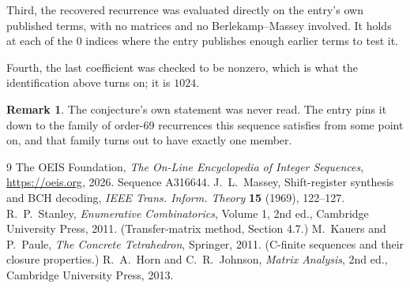 \documentclass[11pt,a4paper]{article}
\theoremstyle{plain}
\theoremstyle{definition}
\newtheorem{remark}[theorem]{Remark}
\begin{document}
Third, the recovered recurrence was evaluated directly on the entry's own published terms, with
no matrices and no Berlekamp--Massey involved. It holds at each of the $0$ indices where
the entry publishes enough earlier terms to test it.

Fourth, the last coefficient was checked to be nonzero, which is what the identification above
turns on; it is $1024$.

\begin{remark}
The conjecture's own statement was never read. The entry pins it down to the family of
order-$69$ recurrences this sequence satisfies from some point on, and that family turns
out to have exactly one member.
\end{remark}

\begin{thebibliography}{9}
 The OEIS Foundation, \emph{The On-Line Encyclopedia of Integer
Sequences}, \url{https://oeis.org}, 2026. Sequence A316644.
 J.~L.~Massey, Shift-register synthesis and BCH decoding, \emph{IEEE
Trans. Inform. Theory} \textbf{15} (1969), 122--127.
 R.~P.~Stanley, \emph{Enumerative Combinatorics}, Volume 1, 2nd ed.,
Cambridge University Press, 2011. (Transfer-matrix method, Section 4.7.)
 M.~Kauers and P.~Paule, \emph{The Concrete Tetrahedron}, Springer, 2011.
(C-finite sequences and their closure properties.)
 R.~A.~Horn and C.~R.~Johnson, \emph{Matrix Analysis}, 2nd ed., Cambridge
University Press, 2013.
\end{thebibliography}
\end{document}
